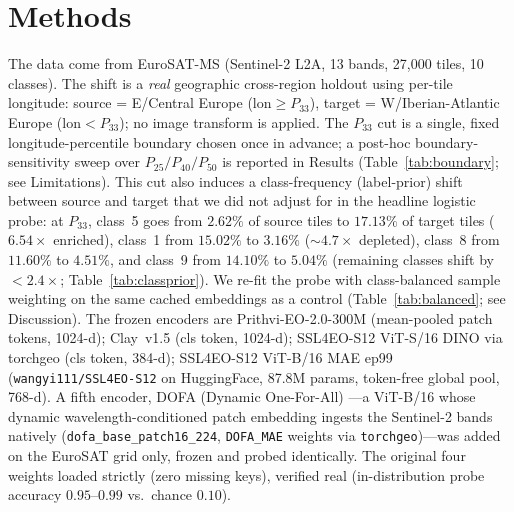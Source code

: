 \documentclass[11pt]{article}
\begin{document}
\section{Methods}\label{sec:methods}
The data come from EuroSAT-MS \citep{helber2019eurosat} (Sentinel-2 L2A, 13 bands, 27{,}000 tiles, 10 classes). The shift is a
\emph{real} geographic cross-region holdout using per-tile longitude: source = E/Central Europe
($\mathrm{lon}\ge P_{33}$), target = W/Iberian-Atlantic Europe ($\mathrm{lon}<P_{33}$); no image transform is
applied. The $P_{33}$ cut is a single, fixed longitude-percentile boundary chosen once in advance; a post-hoc
boundary-sensitivity sweep over $P_{25}/P_{40}/P_{50}$ is reported in Results (Table~\ref{tab:boundary};
see Limitations). This cut also induces a class-frequency (label-prior) shift
between source and target that we did not adjust for in the headline logistic probe: at $P_{33}$, class~5
goes from $2.62\%$ of source tiles to $17.13\%$ of target tiles ($6.54\times$ enriched), class~1 from
$15.02\%$ to $3.16\%$ ($\sim\!4.7\times$ depleted), class~8 from $11.60\%$ to $4.51\%$, and class~9 from
$14.10\%$ to $5.04\%$ (remaining classes shift by ${<}2.4\times$; Table~\ref{tab:classprior}). We
re-fit the probe with class-balanced sample weighting on the same cached embeddings as a control
(Table~\ref{tab:balanced}; see Discussion). The frozen encoders are Prithvi-EO-2.0-300M \citep{szwarcman2024prithvi} (mean-pooled patch tokens, 1024-d); Clay~v1.5 \citep{clay2024model}
(cls token, 1024-d); SSL4EO-S12 \citep{wang2023ssl4eo} ViT-S/16 DINO via torchgeo (cls token, 384-d); SSL4EO-S12 \citep{wang2023ssl4eo} ViT-B/16 MAE ep99
(\texttt{wangyi111/SSL4EO-S12} on HuggingFace, 87.8M params, token-free global pool, 768-d). A fifth
encoder, DOFA (Dynamic One-For-All) \citep{xiong2024dofa}---a ViT-B/16 whose dynamic
wavelength-conditioned patch embedding ingests the Sentinel-2 bands natively (\texttt{dofa\_base\_patch16\_224},
\texttt{DOFA\_MAE} weights via \texttt{torchgeo})---was added on the EuroSAT grid only, frozen and probed
identically. The original four weights loaded strictly (zero missing keys), verified real (in-distribution probe accuracy
$0.95$--$0.99$ vs.\ chance $0.10$).
\end{document}
